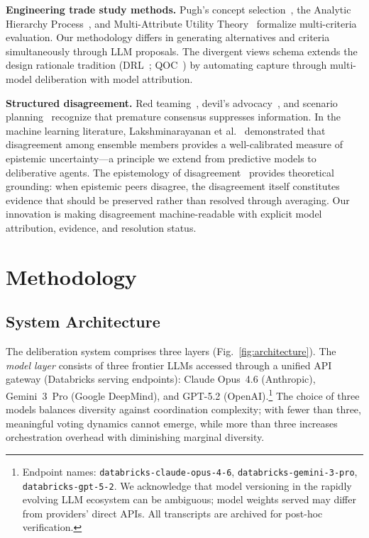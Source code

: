 \documentclass[11pt,a4paper]{article}
\begin{document}
\textbf{Engineering trade study methods.} Pugh's concept selection~\cite{pugh1991total}, the Analytic Hierarchy Process~\cite{saaty1980ahp}, and Multi-Attribute Utility Theory~\cite{keeney1976decisions} formalize multi-criteria evaluation. Our methodology differs in generating alternatives and criteria simultaneously through LLM proposals. The divergent views schema extends the design rationale tradition (DRL~\cite{lee1991drl}; QOC~\cite{maclean1991qoc}) by automating capture through multi-model deliberation with model attribution.

\textbf{Structured disagreement.} Red teaming~\cite{zenko2015red}, devil's advocacy~\cite{schwenk1990effects}, and scenario planning~\cite{schwartz1996art} recognize that premature consensus suppresses information. In the machine learning literature, Lakshminarayanan et al.~\cite{lakshminarayanan2017simple} demonstrated that disagreement among ensemble members provides a well-calibrated measure of epistemic uncertainty---a principle we extend from predictive models to deliberative agents. The epistemology of disagreement~\cite{christensen2013epistemology} provides theoretical grounding: when epistemic peers disagree, the disagreement itself constitutes evidence that should be preserved rather than resolved through averaging. Our innovation is making disagreement machine-readable with explicit model attribution, evidence, and resolution status.

\section{Methodology}
\label{sec:methodology}

\subsection{System Architecture}
\label{sec:architecture}

The deliberation system comprises three layers (Fig.~\ref{fig:architecture}). The \emph{model layer} consists of three frontier LLMs accessed through a unified API gateway (Databricks serving endpoints): Claude Opus~4.6 (Anthropic), Gemini~3~Pro (Google DeepMind), and GPT-5.2 (OpenAI).\footnote{Endpoint names: \texttt{databricks-claude-opus-4-6}, \texttt{databricks-gemini-3-pro}, \texttt{databricks-gpt-5-2}. We acknowledge that model versioning in the rapidly evolving LLM ecosystem can be ambiguous; model weights served may differ from providers' direct APIs. All transcripts are archived for post-hoc verification.} The choice of three models balances diversity against coordination complexity; with fewer than three, meaningful voting dynamics cannot emerge, while more than three increases orchestration overhead with diminishing marginal diversity.
\end{document}
